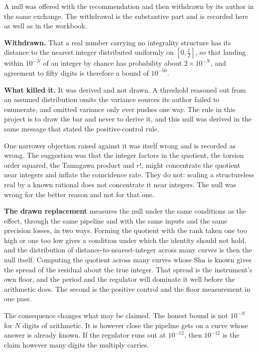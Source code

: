 A null was offered with the recommendation and then withdrawn by its author in the same exchange.
The withdrawal is the substantive part and is recorded here as well as in the workbook.

\textbf{Withdrawn.} That a real number carrying no integrality structure has its distance to the
nearest integer distributed uniformly on $[0,\tfrac12]$, so that landing within $10^{-N}$ of an
integer by chance has probability about $2\times10^{-N}$, and agreement to fifty digits is
therefore a bound of $10^{-50}$.

\textbf{What killed it.} It was derived and not drawn. A threshold reasoned out from an assumed
distribution omits the variance sources its author failed to enumerate, and omitted variance only
ever pushes one way. The rule in this project is to draw the bar and never to derive it, and this
null was derived in the same message that stated the positive-control rule.

One narrower objection raised against it was itself wrong and is recorded as wrong. The suggestion
was that the integer factors in the quotient, the torsion order squared, the Tamagawa product and
$r!$, might concentrate the quotient near integers and inflate the coincidence rate. They do not:
scaling a structureless real by a known rational does not concentrate it near integers. The null was
wrong for the better reason and not for that one.

\textbf{The drawn replacement} measures the null under the same conditions as the effect, through
the same pipeline and with the same inputs and the same precision losses, in two ways. Forming the
quotient with the rank taken one too high or one too low gives a condition under which the identity
should not hold, and the distribution of distance-to-nearest-integer across many curves is then the
null itself. Computing the quotient across many curves whose $\mathrm{Sha}$ is known gives the
spread of the residual about the true integer. That spread is the instrument's own floor, and the
period and the regulator will dominate it well before the arithmetic does. The second is the
positive control and the floor measurement in one pass.

The consequence changes what may be claimed. The honest bound is not $10^{-N}$ for $N$ digits of
arithmetic. It is however close the pipeline gets on a curve whose answer is already known. If the
regulator runs out at $10^{-12}$, then $10^{-12}$ is the claim however many digits the multiply
carries.

